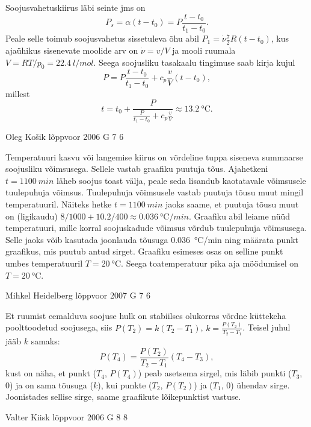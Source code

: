 \documentclass[11pt]{article}
\begin{document}
{{\ifSolution
Soojusvahetuskiirus läbi seinte jms on $$P_s=\alpha (t-t_0)=P\frac{t-t_0}{t_1-t_0}.$$
Peale selle toimub soojusvahetus sissetuleva õhu abil
$P_1=\dot\nu \frac 72 R (t-t_0)$, kus ajaühikus sisenevate moolide arv on $\dot\nu=v/V$ ja mooli ruumala $V=RT/p_0=\SI{22,4}{l/mol}$.
Seega soojusliku tasakaalu tingimuse saab kirja kujul
$$P= P\frac{t-t_0}{t_1-t_0} + c_p\frac vV(t-t_0),$$
millest $$t=t_0+\frac{P}{\frac{P}{t_1-t_0}+c_p\frac{v}{V}}
\approx \SI{13,2}{\celsius}.$$
\fi
}

{Oleg Košik} %
{lõppvoor} %
{2006} %
{G 7} %
{6} %
{

\ifSolution
Temperatuuri kasvu või langemise kiirus on võrdeline tuppa siseneva summaarse soojusliku võimsusega. Sellele vastab graafiku puutuja tõus. Ajahetkeni $t = \SI{1100}{min}$ läheb soojus toast välja, peale seda lisandub kaotatavale võimsusele tuulepuhuja võimsus. Tuulepuhuja võimsusele vastab puutuja tõusu muut mingil temperatuuril. Näiteks hetke $t = \SI{1100}{min}$ jaoks saame, et puutuja tõusu muut on (ligikaudu) $8/1000 + \num{10,2}/400 \approx \SI{0,036}{\celsius/min}$. Graafiku abil leiame nüüd temperatuuri, mille korral soojuskadude võimsus võrdub tuulepuhuja võimsusega. Selle jaoks võib kasutada joonlauda tõusuga \SI{0,036}{\celsius/min} ning määrata punkt graafikus, mis puutub antud sirget. Graafiku esimeses osas on selline punkt umbes temperatuuril $T = \SI{20}{\celsius}$. Seega toatemperatuur pika aja möödumisel on $T = \SI{20}{\celsius}$.
\fi
}

{Mihkel Heidelberg} %
{lõppvoor} %
{2007} %
{G 7} %
{6} %
{

\ifSolution
Et ruumist eemalduva soojuse hulk on stabiilses olukorras võrdne küttekeha poolttoodetud soojusega, siis $P(T_2) = k(T_2 - T_1)$, $k = \frac{P(T_2)}{T_2-T_1}$. Teisel juhul jääb $k$ samaks:
\[
P(T_4) = \frac{P(T_2)}{T_2-T_1} (T_4 - T_3), 
\]
kust on näha, et punkt ($T_4$, $P(T_4)$) peab asetsema sirgel, mis läbib punkti ($T_3$, $0$) ja on sama tõusuga ($k$), kui punkte ($T_2$, $P(T_2)$) ja ($T_1$, $0$) ühendav sirge. Joonistades sellise sirge, saame graafikute lõikepunktist vastuse. 
\fi
}

{Valter Kiisk} %
{lõppvoor} %
{2006} %
{G 8} %
{8} %
{

}}
\end{document}
